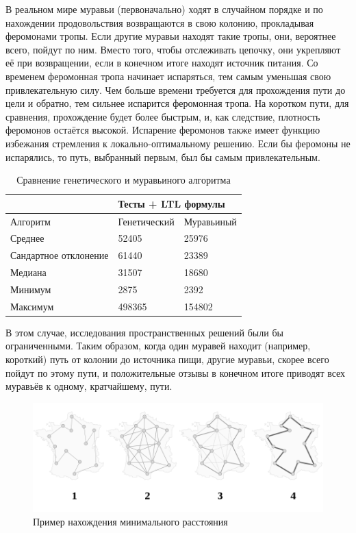 \documentclass{book}
\begin{document}
В реальном мире муравьи (первоначально) ходят в случайном порядке и по нахождении продовольствия возвращаются в свою колонию, прокладывая феромонами тропы. Если другие муравьи находят такие тропы, они, вероятнее всего, пойдут по ним. Вместо того, чтобы отслеживать цепочку, они укрепляют её при возвращении, если в конечном итоге находят источник питания. Со временем феромонная тропа начинает испаряться, тем самым уменьшая свою привлекательную силу. Чем больше времени требуется для прохождения пути до цели и обратно, тем сильнее испарится феромонная тропа. На коротком пути, для сравнения, прохождение будет более быстрым, и, как следствие, плотность феромонов остаётся высокой. Испарение феромонов также имеет функцию избежания стремления к локально-оптимальному решению. Если бы феромоны не испарялись, то путь, выбранный первым, был бы самым привлекательным.

\begin{table}[h]
\caption{Сравнение генетического и муравьиного алгоритма}
\begin{tabular}{|l|ll|}
\hline
                      & \multicolumn{2}{l|}{Тесты + LTL формулы}       \\ \hline
Алгоритм              & \multicolumn{1}{l|}{Генетический} & Муравьиный \\ \hline
Среднее               & \multicolumn{1}{l|}{52405}        & 25976      \\ \hline
Сандартное отклонение & \multicolumn{1}{l|}{61440}        & 23389      \\ \hline
Медиана               & \multicolumn{1}{l|}{31507}        & 18680      \\ \hline
Минимум               & \multicolumn{1}{l|}{2875}         & 2392       \\ \hline
Максимум              & \multicolumn{1}{l|}{498365}       & 154802     \\ \hline
\end{tabular}
\end{table}

В этом случае, исследования пространственных решений были бы ограниченными. Таким образом, когда один муравей находит (например, короткий) путь от колонии до источника пищи, другие муравьи, скорее всего пойдут по этому пути, и положительные отзывы в конечном итоге приводят всех муравьёв к одному, кратчайшему, пути.
\begin{figure}
    \centering
    \includegraphics[scale=0.3]{pics/Без названия.png}
    \caption{Пример нахождения минимального расстояния}
\end{figure}
\end{document}
